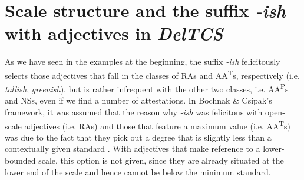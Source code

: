 \documentclass[output=paper
,modfonts
,nonflat]{langsci/langscibook}
\begin{document}
\section{Scale structure and the suffix \textit{-ish} with adjectives in \textit{DelTCS}}
\label{scale-ish-deltcs}

As we have seen in the examples at the beginning, the suffix \textit{-ish} felicitously selects those adjectives that fall in the classes of RAs and AA\textsuperscript{T}s, respectively (i.e. \textit{tallish}, \textit{greenish}), but is rather infrequent with the other two classes, i.e. AA\textsuperscript{P}s and NSs, even if we find a number of attestations.
In Bochnak \& Csipak's \citeyearpar{Bochnak2014} framework, it was assumed that the reason why \textit{-ish} was felicitous with open-scale adjectives (i.e. RAs) and those that feature a maximum value (i.e. AA\textsuperscript{T}s) was due to the fact that they pick out a degree that is slightly less than a contextually given standard \citeyearpar[436]{Bochnak2014}. With adjectives that make reference to a lower-bounded scale, this option is not given, since they are already situated at the lower end of the scale and hence cannot be below the minimum standard.
\end{document}
